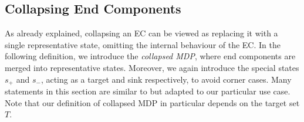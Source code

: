 \documentclass{article}
\newcommand{\targetstate}{s_+}
\newcommand{\sinkstate}{s_-}
\newcommand{\targetset}{T}
\begin{document}
\subsection{Collapsing End Components} \label{sec:brtdp:collapsing}
As already explained, collapsing an EC can be viewed as replacing it with a single representative state, omitting the internal behaviour of the EC.
In the following definition, we introduce the \emph{collapsed MDP}, where end components are merged into representative states.
Moreover, we again introduce the special states $\targetstate$ and $\sinkstate$, acting as a target and sink respectively, to avoid corner cases.
Many statements in this section are similar to \cite[Section~6.4]{de1997formal} but adapted to our particular use case.
Note that our definition of collapsed MDP in particular depends on the target set $\targetset$.
\end{document}
